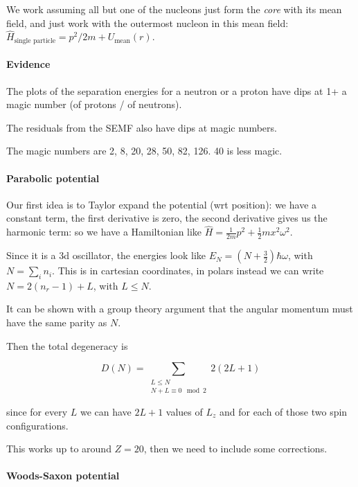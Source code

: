 \documentclass{article}
\begin{document}
We work assuming all but one of the nucleons just form the \emph{core} with its mean field, and just work with the outermost nucleon in this mean field: \(\hat{H}_{\text{single particle}} = p^2 / 2m + U_ \text{mean} (r) \).

\paragraph{Evidence}

The plots of the separation energies for a neutron or a proton have dips at 1+ a magic number (of protons / of neutrons).

The residuals from the SEMF also have dips at magic numbers.

The magic numbers are 2, 8, 20, 28, 50, 82, 126. 40 is less magic.

\paragraph{Parabolic potential}

Our first idea is to Taylor expand the potential (wrt position): we have a constant term, the first derivative is zero, the second derivative gives us the harmonic term: so we have a Hamiltonian like \(\hat{H} = \frac{1}{2m} p^2 + \frac{1}{2} m x^2 \omega^2\).

Since it is a 3d oscillator, the energies look like \(E_N = (N+ \frac{3}{2}) \hbar \omega\), with \(N = \sum _i n_i \). This is in cartesian coordinates, in polars instead we can write \(N = 2(n_r-1) + L\), with \(L \leq N\).

It can be shown with a group theory argument that the angular momentum must have the same parity as \(N\).

Then the total degeneracy is

\begin{equation}
    D(N) = \sum _{\substack{L \leq N \\ N + L \equiv 0 \mod 2}} 2(2L+1)
\end{equation}

since for every \(L\) we can have \(2L+1\) values of \(L_z\) and for each of those two spin configurations.

This works up to around \(Z=20\), then we need to include some corrections.

\paragraph{Woods-Saxon potential}
\end{document}
